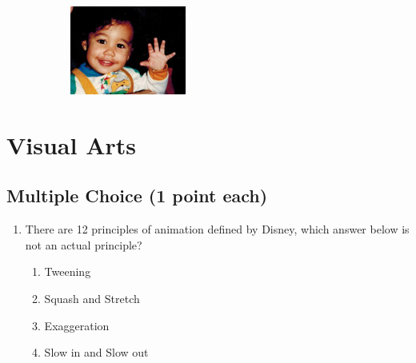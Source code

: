 \documentclass[11pt]{exam}
\begin{document}
\begin{questions}
\begin{figure}[h]
\begin{subfigure}[b]{0.3\textwidth}
        \caption{\underline{\hspace{2cm}}}
        \label{fig:snake}
    \end{subfigure}
    \begin{subfigure}[b]{0.3\textwidth}
        \includegraphics[width=\textwidth]{cute6}
        \caption{\underline{\hspace{2cm}}}
        \label{fig:baby}
    \end{subfigure}
\end{figure}



\newpage
\section{Visual Arts}


\subsection{Multiple Choice (1 point each)}

\begin{enumerate}



\item There are 12 principles of animation defined by Disney, which answer below is not an actual principle?

\begin{enumerate}
\item Tweening
\item Squash and Stretch
\item Exaggeration
\item Slow in and Slow out
\end{enumerate}




\end{enumerate}
\end{questions}
\end{document}
